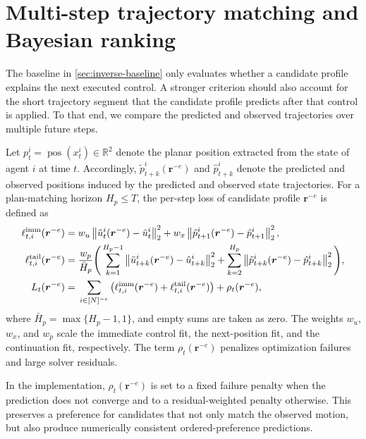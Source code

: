 \section{Multi-step trajectory matching and Bayesian ranking}
\label{sec:inverse-bayesian}

The baseline in \cref{sec:inverse-baseline} only evaluates whether a candidate profile explains the next
executed control.
A stronger criterion should also account for the short trajectory segment that the candidate profile
predicts after that control is applied.
To that end, we compare the predicted and observed trajectories over multiple future steps.

Let $p_t^i = \operatorname{pos}(x_t^i) \in \mathbb{R}^2$ denote the planar position extracted from
the state of agent $i$ at time $t$.
Accordingly, $\tilde{p}_{t+k}^i(\boldsymbol{r}^{-e})$ and $\hat{p}_{t+k}^i$ denote the predicted
and observed positions induced by the predicted and observed state trajectories.
For a plan-matching horizon $H_p \leq T$, the per-step loss of candidate profile
$\boldsymbol{r}^{-e}$ is defined as
\begin{align}
\ell^{\mathrm{imm}}_{t,i}(\boldsymbol{r}^{-e})
=
&\; w_u \left\lVert \tilde{u}^i_t(\boldsymbol{r}^{-e}) - \hat{u}^i_t \right\rVert_2^2
+ w_x \left\lVert \tilde{p}_{t+1}^i(\boldsymbol{r}^{-e}) - \hat{p}_{t+1}^i \right\rVert_2^2,
\notag \\
\ell^{\mathrm{tail}}_{t,i}(\boldsymbol{r}^{-e})
=
&\; \frac{w_p}{\bar{H}_p}
\Bigg(
\sum_{k=1}^{H_p-1}
\left\lVert \tilde{u}^i_{t+k}(\boldsymbol{r}^{-e}) - \hat{u}^i_{t+k} \right\rVert_2^2
+ \sum_{k=2}^{H_p}
\left\lVert \tilde{p}_{t+k}^i(\boldsymbol{r}^{-e}) - \hat{p}_{t+k}^i \right\rVert_2^2
\Bigg),
\notag \\
L_t(\boldsymbol{r}^{-e})
=
&\; \sum_{i \in [N]^{-e}}
\left(
\ell^{\mathrm{imm}}_{t,i}(\boldsymbol{r}^{-e})
+ \ell^{\mathrm{tail}}_{t,i}(\boldsymbol{r}^{-e})
\right)
+ \rho_t(\boldsymbol{r}^{-e}),
\label{eq:inverse_step_loss}
\end{align}
where $\bar{H}_p = \max\{H_p - 1, 1\}$, and empty sums are taken as zero.
The weights $w_u$, $w_x$, and $w_p$ scale the immediate control fit, the next-position fit, and the
continuation fit, respectively.
The term $\rho_t(\boldsymbol{r}^{-e})$ penalizes optimization failures and large solver residuals.

In the implementation, $\rho_t(\boldsymbol{r}^{-e})$ is set to a fixed failure penalty when the prediction does not converge
and to a residual-weighted penalty otherwise.
This preserves a preference for candidates that not only match the observed motion, but also produce
numerically consistent ordered-preference predictions.

